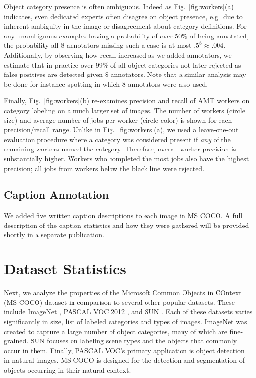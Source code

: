 Object category presence is often ambiguous. Indeed as Fig.~\ref{fig:workers}(a) indicates, even dedicated experts often disagree on object presence, e.g.~due to inherent ambiguity in the image or disagreement about category definitions. For any unambiguous examples having a probability of over 50\% of being annotated, the probability all 8 annotators missing such a case is at most $.5^8 \approx .004$. Additionally, by observing how recall increased as we added annotators, we estimate that in practice over 99\% of all object categories not later rejected as false positives are detected given 8 annotators. Note that a similar analysis may be done for instance spotting in which 8 annotators were also used.

Finally, Fig.~\ref{fig:workers}(b) re-examines precision and recall of AMT workers on category labeling on a much larger set of images. The number of workers (circle size) and average number of jobs per worker (circle color) is shown for each precision/recall range. Unlike in Fig.~\ref{fig:workers}(a), we used a leave-one-out evaluation procedure where a category was considered present if \emph{any} of the remaining workers named the category. Therefore, overall worker precision is substantially higher. Workers who completed the most jobs also have the highest precision; all jobs from workers below the black line were rejected.

\subsection{Caption Annotation}

We added five written caption descriptions to each image in MS COCO. A full description of the caption statistics and how they were gathered will be provided shortly in a separate publication.

\section{Dataset Statistics}

Next, we analyze the properties of the Microsoft Common Objects in COntext (MS COCO) dataset in comparison to several other popular datasets. These include ImageNet \cite{Imagenet}, PASCAL VOC 2012 \cite{PASCAL}, and SUN \cite{SUN}. Each of these datasets varies significantly in size, list of labeled categories and types of images. ImageNet was created to capture a large number of object categories, many of which are fine-grained. SUN focuses on labeling scene types and the objects that commonly occur in them. Finally, PASCAL VOC's primary application is object detection in natural images. MS COCO is designed for the detection and segmentation of objects occurring in their natural context.

